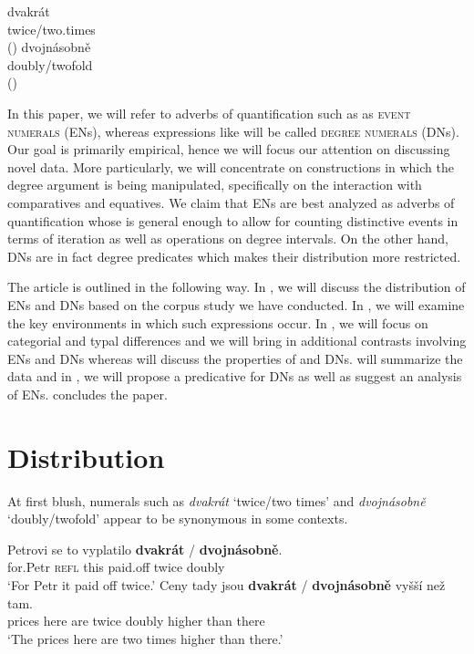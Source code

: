 \documentclass[output=paper,modfonts,hidelinks,newtxmath
\ChapterDOI{10.5281/zenodo.2545513}
]{langscibook}
\begin{document}
\ea\label{twice-double-czech} \ea \gll dvakrát\label{dvakrat-czech}\\ 
          twice/two.times\\\hfill()
     \ex \gll dvojnásobně\label{dvojnasobne-czech}\\
          doubly/twofold\\\hfill()
          \z
\z

\noindent In this paper, we will refer to  adverbs of quantification such as  as \textsc{event numerals} (ENs), whereas expressions like  will be called \textsc{degree numerals} (DNs). Our goal is primarily empirical, hence we will focus our attention on discussing novel data. More particularly, we will concentrate on constructions in which the degree argument is being manipulated, specifically on the interaction with comparatives and equatives. We claim that ENs are best analyzed as adverbs of quantification whose  is general enough to allow for counting distinctive events in terms of iteration as well as operations on degree intervals. On the other hand, DNs are in fact degree predicates which makes their distribution more restricted.

\largerpage[2]
The article is outlined in the following way. In , we will discuss the distribution of  ENs and DNs based on the corpus study we have conducted. In , we will examine the key environments in which such expressions occur. In , we will focus on categorial and typal differences and we will bring in additional contrasts involving ENs and DNs whereas  will discuss the properties of  and  DNs.  will summarize the data and in , we will propose a predicative  for DNs as well as suggest an analysis of ENs.  concludes the paper.

\section{Distribution}\label{distribution}

At first blush,  numerals such as \textit{dvakrát} `twice/two times' and \textit{dvojnásobně} `doubly/twofold' appear to be synonymous in some contexts.

\ea \ea \gll Petrovi se to vyplatilo \textbf{dvakrát} / \textbf{dvojnásobně}.\\
for.Petr \textsc{refl} this paid.off twice {} doubly\\
\glt `For Petr it paid off twice.'
\ex \gll Ceny tady jsou \textbf{dvakrát} / \textbf{dvojnásobně} vyšší než tam.\\
prices here are twice {} doubly higher than there\\
\glt `The prices here are two times higher than there.'
\z
\z
\end{document}
